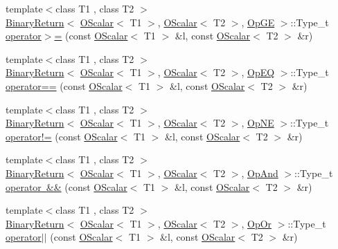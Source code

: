 \begin{DoxyCompactItemize}
\item 
{\footnotesize template$<$class T1 , class T2 $>$ }\\\mbox{\hyperlink{structENSEM_1_1BinaryReturn}{Binary\+Return}}$<$ \mbox{\hyperlink{classENSEM_1_1OScalar}{O\+Scalar}}$<$ T1 $>$, \mbox{\hyperlink{classENSEM_1_1OScalar}{O\+Scalar}}$<$ T2 $>$, \mbox{\hyperlink{structENSEM_1_1OpGE}{Op\+GE}} $>$\+::Type\+\_\+t \mbox{\hyperlink{group__obsscalar_ga662fdae406fd639518843fb671368f0d}{operator$>$=}} (const \mbox{\hyperlink{classENSEM_1_1OScalar}{O\+Scalar}}$<$ T1 $>$ \&l, const \mbox{\hyperlink{classENSEM_1_1OScalar}{O\+Scalar}}$<$ T2 $>$ \&r)
\item 
{\footnotesize template$<$class T1 , class T2 $>$ }\\\mbox{\hyperlink{structENSEM_1_1BinaryReturn}{Binary\+Return}}$<$ \mbox{\hyperlink{classENSEM_1_1OScalar}{O\+Scalar}}$<$ T1 $>$, \mbox{\hyperlink{classENSEM_1_1OScalar}{O\+Scalar}}$<$ T2 $>$, \mbox{\hyperlink{structENSEM_1_1OpEQ}{Op\+EQ}} $>$\+::Type\+\_\+t \mbox{\hyperlink{group__obsscalar_ga95c536ecc3b51c1ac09a016d357d7237}{operator==}} (const \mbox{\hyperlink{classENSEM_1_1OScalar}{O\+Scalar}}$<$ T1 $>$ \&l, const \mbox{\hyperlink{classENSEM_1_1OScalar}{O\+Scalar}}$<$ T2 $>$ \&r)
\item 
{\footnotesize template$<$class T1 , class T2 $>$ }\\\mbox{\hyperlink{structENSEM_1_1BinaryReturn}{Binary\+Return}}$<$ \mbox{\hyperlink{classENSEM_1_1OScalar}{O\+Scalar}}$<$ T1 $>$, \mbox{\hyperlink{classENSEM_1_1OScalar}{O\+Scalar}}$<$ T2 $>$, \mbox{\hyperlink{structENSEM_1_1OpNE}{Op\+NE}} $>$\+::Type\+\_\+t \mbox{\hyperlink{group__obsscalar_ga0dc8425f7eb49097253c996107d2ff8e}{operator!=}} (const \mbox{\hyperlink{classENSEM_1_1OScalar}{O\+Scalar}}$<$ T1 $>$ \&l, const \mbox{\hyperlink{classENSEM_1_1OScalar}{O\+Scalar}}$<$ T2 $>$ \&r)
\item 
{\footnotesize template$<$class T1 , class T2 $>$ }\\\mbox{\hyperlink{structENSEM_1_1BinaryReturn}{Binary\+Return}}$<$ \mbox{\hyperlink{classENSEM_1_1OScalar}{O\+Scalar}}$<$ T1 $>$, \mbox{\hyperlink{classENSEM_1_1OScalar}{O\+Scalar}}$<$ T2 $>$, \mbox{\hyperlink{structENSEM_1_1OpAnd}{Op\+And}} $>$\+::Type\+\_\+t \mbox{\hyperlink{group__obsscalar_ga7e3b0e4d68793d07ed6616df54117609}{operator \&\&}} (const \mbox{\hyperlink{classENSEM_1_1OScalar}{O\+Scalar}}$<$ T1 $>$ \&l, const \mbox{\hyperlink{classENSEM_1_1OScalar}{O\+Scalar}}$<$ T2 $>$ \&r)
\item 
{\footnotesize template$<$class T1 , class T2 $>$ }\\\mbox{\hyperlink{structENSEM_1_1BinaryReturn}{Binary\+Return}}$<$ \mbox{\hyperlink{classENSEM_1_1OScalar}{O\+Scalar}}$<$ T1 $>$, \mbox{\hyperlink{classENSEM_1_1OScalar}{O\+Scalar}}$<$ T2 $>$, \mbox{\hyperlink{structENSEM_1_1OpOr}{Op\+Or}} $>$\+::Type\+\_\+t \mbox{\hyperlink{group__obsscalar_gae6474aecd45d7fea902ccc4db61bfaaa}{operator$\vert$$\vert$}} (const \mbox{\hyperlink{classENSEM_1_1OScalar}{O\+Scalar}}$<$ T1 $>$ \&l, const \mbox{\hyperlink{classENSEM_1_1OScalar}{O\+Scalar}}$<$ T2 $>$ \&r)

\end{DoxyCompactItemize}
